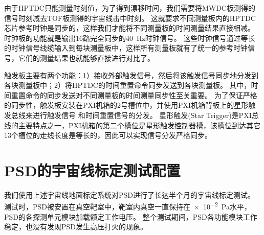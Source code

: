由于HPTDC只能测量时刻值，为了得到漂移时间，我们需要将MWDC板测得的信号时刻减去TOF板测得的宇宙线击中时刻。
这就要求不同测量板内的HPTDC芯片参考时钟是同步的，这样我们才能将不同测量板的时间测量结果直接相减。
时钟板的功能就是输出16路完全同步的\SI{40}{Hz}时钟信号。
这些时钟信号通过等长的时钟信号线缆输入到每块测量板中，这样所有测量板就有了统一的参考时钟信号，它们的测量结果也就能够直接进行对比了。

触发板主要有两个功能：1）接收外部触发信号，然后将该触发信号同步地分发到各块测量板中；2）将HPTDC的时间重置命令同步发送到各块测量板。
其中，时间重置命令的同步发送对不同测量板的时间测量同步性至关重要。
为了保证严格的同步性，触发板安装在PXI机箱的2号槽位中，并使用PXI机箱背板上的星形触发总线来进行触发信号
和时间重置信号的分发。
星形触发(Star Trigger)是PXI总线的主要特点之一，PXI机箱的第二个槽位是星形触发控制器槽，该槽位到达其它13个槽位的走线长度是等长的，因此可以实现信号分发严格同步。


\section{PSD的宇宙线标定测试配置}

我们使用上述宇宙线地面标定系统对PSD进行了长达半个月的宇宙线标定测试。
测试时，PSD被安置在真空靶室中，靶室内真空一直保持在\SI{e-2}{Pa}水平，PSD的各探测单元模块加载额定工作电压。
整个测试期间，PSD各功能模块工作稳定，也没有发现PSD发生高压打火的现象。

